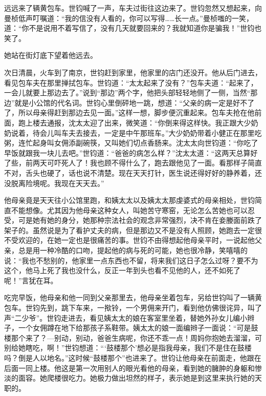 \par 远远来了辆黄包车。世钧喊了一声，车夫过街往这边来了。世钧忽然又想起来，向曼桢低声叮嘱道：“我的信没有人看的，你可以写得……长一点。”曼桢嗤的一笑，道：“你不是说用不着写信了，没有几天就要回来的？我就知道你是骗我！”世钧也笑了。
\par 她站在街灯底下望着他远去。
\par 次日清晨，火车到了南京，世钧赶到家里，他家里的店门还没开。他从后门进去，看见包车夫在那里掸拭包车。世钧道：“太太起来了没有？”包车夫道：“起来了，一会儿就要上那边去了。”说到“那边”两个字，他把头部轻轻地侧了一侧，当然“那边”就是小公馆的代名词。世钧心里倒砰地一跳，想道：“父亲的病一定是好不了了，所以母亲得赶到那边去见一面。”这样一想，脚步便沉重起来。包车夫抢在他前面，跑上楼去通报，沈太太迎了出来，微笑道：“你倒来得这样快。我正跟大少奶奶说着，待会儿叫车夫去接去，一定是中午那班车。”大少奶奶带着小健正在那里吃粥，连忙起身叫女佣添副碗筷，又叫她们切点香肠来。沈太太向世钧道：“你吃了早饭就跟我一块儿去吧。”世钧道：“爸爸的病怎么样？”沈太太道：“这两天总算好了些，前两天可吓死人了！我也顾不得什么了，跑去跟他见了一面。看那样子简直不对，舌头也硬了，话也说不清楚。现在天天打针，医生说还得好好的静养着，还没脱离险境呢。我现在天天去。”
\par 他母亲竟是天天往小公馆里跑，和姨太太以及姨太太那虔婆式的母亲相处，世钧简直不能想像。尤其因为他母亲这种女人，叫她苦守寒窑，无论怎么苦她也可以忍受，可是她有她的身分，她那种宗法社会的观念非常强烈，决不肯在妾媵面前跌了架子的。虽然说是为了看护丈夫的病，但是那边又不是没有人照顾，她跑去一定很不受欢迎的，在她一定也是很痛苦的事。世钧不由得想起他母亲平时，一说起他父亲，总是用一种冷酷的口吻，提起他的病与死的可能，她也很冷静，笑嘻嘻的说：“我也不愁别的，他家里一点东西也不留，将来我们这日子怎么过呀？要不为这个，他马上死了我也没什么，反正一年到头也看不见他的人，还不如死了呢！”言犹在耳。
\par 吃完早饭，他母亲和他一同到父亲那里去，他母亲坐着包车，另给世钧叫了一辆黄包车。世钧先到，跳下车来，一揿铃，一个男佣来开门，看到他仿佛很诧异，叫了声“二少爷”。世钧走进去，看见姨太太的娘在客室里坐着，替她外孙女儿编小辫子，一个女佣蹲在地下给那孩子系鞋带。姨太太的娘一面编辫子一面说：“可是鼓楼那个来了？—别动，别动，爸爸生病呢，你还不乖一点！周妈你抱她去溜溜，可别给她瞎吃，啊！”世钧想道：“‘鼓楼那个’想必是指我母亲，我们不是住在鼓楼吗？倒是人以地名。”这时候“鼓楼那个”也进来了。世钧让他母亲在前面走，他跟在后面一同上楼。他这是第一次用别人的眼光看他的母亲，看到她的臃肿的身躯和惨淡的面容。她爬楼很吃力。她极力做出坦然的样子，表示她是到这里来执行她的天职的。
